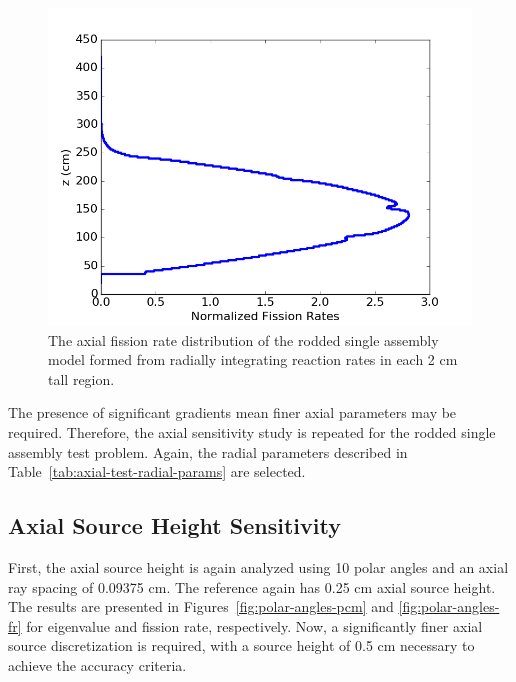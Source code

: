 \begin{figure}[h!]
	\centering
	\includegraphics[width=0.7\linewidth]{figures/results/rr-plots/single-assembly-rodded-axial.png}
	\caption[]{The axial fission rate distribution of the rodded single assembly model formed from radially integrating reaction rates in each 2 cm tall region.}
	\label{fig:single-assembly-rodded-axial}
\end{figure}

The presence of significant gradients mean finer axial parameters may be required. Therefore, the axial sensitivity study is repeated for the rodded single assembly test problem. Again, the radial parameters described in Table~\ref{tab:axial-test-radial-params} are selected.

\subsection{Axial Source Height Sensitivity}

First, the axial source height is again analyzed using 10 polar angles and an axial ray spacing of 0.09375 cm. The reference again has 0.25 cm axial source height. The results are presented in Figures~\ref{fig:polar-angles-pcm} and \ref{fig:polar-angles-fr} for eigenvalue and fission rate, respectively. Now, a significantly finer axial source discretization is required, with a source height of 0.5 cm necessary to achieve the accuracy criteria.

